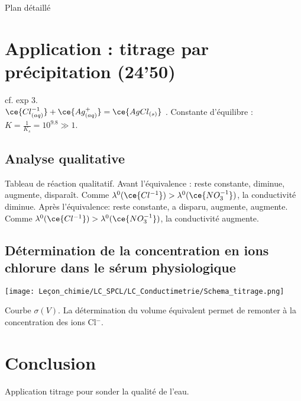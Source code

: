 \begin{reportBlock}{Plan détaillé}
\section{Application : titrage par précipitation (24'50)}
cf. exp 3. \\

$ \ce{Cl^{-1}_{(aq)}} + \ce{Ag^+_{(aq)}} = \ce{AgCl_{(s)}}$ . Constante d'équilibre : $K = \frac{1}{K_s} = 10^{9.8} \gg 1$.

\subsection{Analyse qualitative}

Tableau de réaction qualitatif. Avant l'équivalence :  reste constante,  diminue,  augmente,  disparaît. Comme $\lambda^0(\ce{Cl^{-1}}) > \lambda^0(\ce{NO_3^{-1}})$, la conductivité diminue. Après l'équivalence:  reste constante,  a disparu,  augmente,  augmente. Comme $\lambda^0(\ce{Cl^{-1}}) > \lambda^0(\ce{NO_3^{-1}})$, la conductivité augmente.

\subsection{Détermination de la concentration en ions chlorure dans le sérum physiologique}

  \begin{center}
   \texttt{[image: Leçon\_chimie/LC\_SPCL/LC\_Conductimetrie/Schema\_titrage.png]}
  \end{center}
 


Courbe $\sigma(V)$. La détermination du volume équivalent permet de remonter à la concentration des ions Cl$^-$.

\section{Conclusion} Application titrage pour sonder la qualité de l'eau.

\end{reportBlock}

